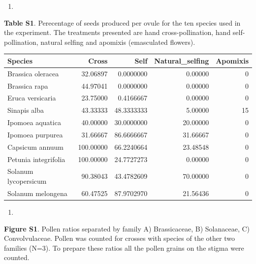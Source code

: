 \documentclass[11pt,a4paper]{article}
\begin{document}
\begin{enumerate}
\def\labelenumi{\arabic{enumi}.}
\item
\end{enumerate}

\textbf{Table S1}. Perecentage of seeds produced per ovule for the ten
species used in the experiment. The treatments presented are hand
cross-pollination, hand self-pollination, natural selfing and apomixis
(emasculated flowers).

\begin{longtable}[]{@{}lrrrr@{}}
\toprule
Species & Cross & Self & Natural\_selfing & Apomixis\tabularnewline
\midrule
\endhead
Brassica oleracea & 32.06897 & 0.0000000 & 0.00000 & 0\tabularnewline
Brassica rapa & 44.97041 & 0.0000000 & 0.00000 & 0\tabularnewline
Eruca versicaria & 23.75000 & 0.4166667 & 0.00000 & 0\tabularnewline
Sinapis alba & 43.33333 & 48.3333333 & 5.00000 & 15\tabularnewline
Ipomoea aquatica & 40.00000 & 30.0000000 & 20.00000 & 0\tabularnewline
Ipomoea purpurea & 31.66667 & 86.6666667 & 31.66667 & 0\tabularnewline
Capsicum annuum & 100.00000 & 66.2240664 & 23.48548 & 0\tabularnewline
Petunia integrifolia & 100.00000 & 24.7727273 & 0.00000 &
0\tabularnewline
Solanum lycopersicum & 90.38043 & 43.4782609 & 70.00000 &
0\tabularnewline
Solanum melongena & 60.47525 & 87.9702970 & 21.56436 & 0\tabularnewline
\bottomrule
\end{longtable}

\begin{enumerate}
\def\labelenumi{\arabic{enumi}.}
\setcounter{enumi}{1}
\item
\end{enumerate}

\textbf{Figure S1}. Pollen ratios separated by family A) Brassicaceae,
B) Solanaceae, C) Convolvulaceae. Pollen was counted for crosses with
species of the other two families (N=3). To prepare these ratios all the
pollen grains on the stigma were counted.
\end{document}
